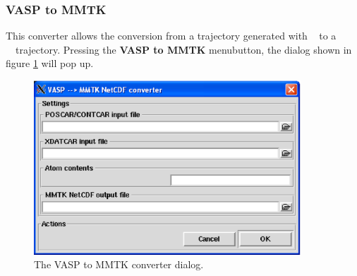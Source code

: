 \documentclass[a4paper,11pt]{report}
\begin{document}
\subsubsection{VASP to MMTK}
\label{vasp_to_mmtk}
This converter allows the conversion from a trajectory generated with \VASP\ \cite{VASP} to a \MMTK\ \NetCDF\ trajectory. 
Pressing the \textbf{VASP to MMTK} menubutton, the dialog shown in figure \ref{fig:vasp_converter} will pop up.
\begin{figure}[h!]
\begin{center}
\includegraphics[width=10cm]{Figures/vasp_converter.eps}
\end{center}
\caption[The VASP to MMTK converter dialog]{The VASP to MMTK converter dialog.}
\label{fig:vasp_converter}
\end{figure}   
\end{document}
